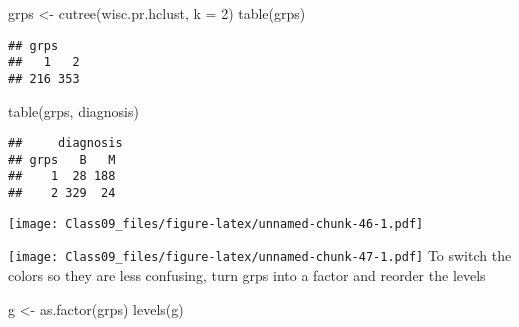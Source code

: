 \documentclass[
]{article}
\newenvironment{Shaded}{\begin{snugshade}}{\end{snugshade}}
\newcommand{\AttributeTok}[1]{\textcolor[rgb]{0.77,0.63,0.00}{#1}}
\newcommand{\DecValTok}[1]{\textcolor[rgb]{0.00,0.00,0.81}{#1}}
\newcommand{\FunctionTok}[1]{\textcolor[rgb]{0.00,0.00,0.00}{#1}}
\newcommand{\NormalTok}[1]{#1}
\newcommand{\OtherTok}[1]{\textcolor[rgb]{0.56,0.35,0.01}{#1}}
\newcommand{\SpecialCharTok}[1]{\textcolor[rgb]{0.00,0.00,0.00}{#1}}
\begin{document}
\begin{Shaded}
\begin{Highlighting}[]
\NormalTok{grps }\OtherTok{\textless{}{-}} \FunctionTok{cutree}\NormalTok{(wisc.pr.hclust, }\AttributeTok{k =} \DecValTok{2}\NormalTok{)}
\FunctionTok{table}\NormalTok{(grps)}
\end{Highlighting}
\end{Shaded}

\begin{verbatim}
## grps
##   1   2 
## 216 353
\end{verbatim}

\begin{Shaded}
\begin{Highlighting}[]
\FunctionTok{table}\NormalTok{(grps, diagnosis)}
\end{Highlighting}
\end{Shaded}

\begin{verbatim}
##     diagnosis
## grps   B   M
##    1  28 188
##    2 329  24
\end{verbatim}

\begin{Shaded}
\end{Shaded}

\texttt{[image: Class09\_files/figure-latex/unnamed-chunk-46-1.pdf]}

\begin{Shaded}
\end{Shaded}

\texttt{[image: Class09\_files/figure-latex/unnamed-chunk-47-1.pdf]} To
switch the colors so they are less confusing, turn grps into a factor
and reorder the levels

\begin{Shaded}
\begin{Highlighting}[]
\NormalTok{g }\OtherTok{\textless{}{-}} \FunctionTok{as.factor}\NormalTok{(grps)}
\FunctionTok{levels}\NormalTok{(g)}
\end{Highlighting}
\end{Shaded}
\end{document}
